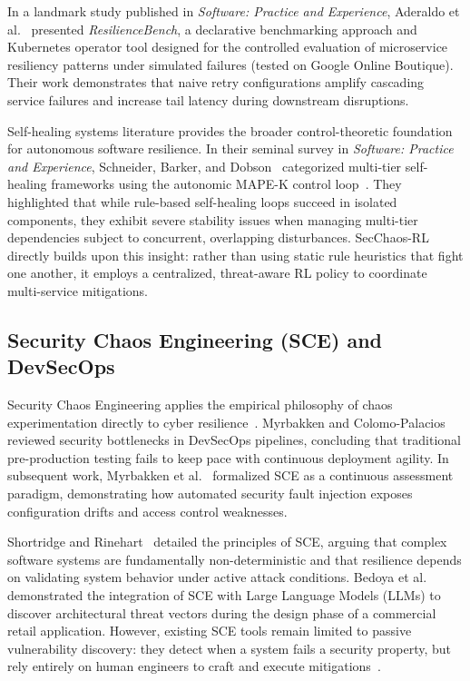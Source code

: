 \documentclass[11pt,a4paper]{article}
\begin{document}
In a landmark study published in \textit{Software: Practice and Experience}, Aderaldo et al.~\cite{aderaldo2025declarative} presented \textit{ResilienceBench}, a declarative benchmarking approach and Kubernetes operator tool designed for the controlled evaluation of microservice resiliency patterns under simulated failures (tested on Google Online Boutique). Their work demonstrates that naive retry configurations amplify cascading service failures and increase tail latency during downstream disruptions.

Self-healing systems literature provides the broader control-theoretic foundation for autonomous software resilience. In their seminal survey in \textit{Software: Practice and Experience}, Schneider, Barker, and Dobson~\cite{schneider2015survey} categorized multi-tier self-healing frameworks using the autonomic MAPE-K control loop~\cite{garlan2004rainbow, salehie2009self}. They highlighted that while rule-based self-healing loops succeed in isolated components, they exhibit severe stability issues when managing multi-tier dependencies subject to concurrent, overlapping disturbances. SecChaos-RL directly builds upon this insight: rather than using static rule heuristics that fight one another, it employs a centralized, threat-aware RL policy to coordinate multi-service mitigations.

\subsection{Security Chaos Engineering (SCE) and DevSecOps}
Security Chaos Engineering applies the empirical philosophy of chaos experimentation directly to cyber resilience~\cite{shortridge2023security}. Myrbakken and Colomo-Palacios~\cite{myrbakken2020security} reviewed security bottlenecks in DevSecOps pipelines, concluding that traditional pre-production testing fails to keep pace with continuous deployment agility. In subsequent work, Myrbakken et al.~\cite{myrbakken2021security} formalized SCE as a continuous assessment paradigm, demonstrating how automated security fault injection exposes configuration drifts and access control weaknesses.

Shortridge and Rinehart~\cite{shortridge2023security} detailed the principles of SCE, arguing that complex software systems are fundamentally non-deterministic and that resilience depends on validating system behavior under active attack conditions. Bedoya et al.~\cite{bedoya2024enhancing} demonstrated the integration of SCE with Large Language Models (LLMs) to discover architectural threat vectors during the design phase of a commercial retail application. However, existing SCE tools remain limited to passive vulnerability discovery: they detect when a system fails a security property, but rely entirely on human engineers to craft and execute mitigations~\cite{shortridge2023security, owotogbe2025chaos}.
\end{document}
